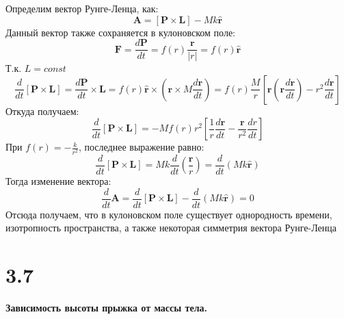 \documentclass[a4paper,14pt]{article}
\begin{document}
Определим вектор Рунге-Ленца, как:
\begin{equation*}
\mathbf A = [\mathbf P \times \mathbf L] - Mk\widehat{\mathbf r}
\end{equation*}
Данный вектор также сохраняется в кулоновском поле:
\begin{equation*}
\mathbf F =\frac{d \mathbf P}{dt} = f(r)\frac{\mathbf r}{|r|} = f(r)\widehat{\mathbf r}
\end{equation*}
Т.к. $L = const$
\begin{equation*}
\frac{d}{dt} [\mathbf P \times \mathbf L ] = \frac{d \mathbf P}{dt} \times \mathbf L =  f(r)\widehat{\mathbf r} \times \left(\mathbf r \times M \frac{d\mathbf r}{dt} \right) =  f(r)\frac{M}{r}\left[ \mathbf r\left(\mathbf r \frac{d\mathbf r}{dt}\right) - r^2\frac{d\mathbf r}{dt} \right]
\end{equation*}
Откуда получаем:
\begin{equation*}
\frac{d}{dt} [\mathbf P \times \mathbf L ] = -M f(r) r^2 \left[\frac{1}{r}\frac{d\mathbf r}{dt} - \frac{\mathbf r}{r^2}\frac{dr}{dt}  \right]
\end{equation*}
При $f(r) = -\frac{k}{r^2}$, последнее выражение равно:
\begin{equation*}
\frac{d}{dt} [\mathbf P \times \mathbf L ] = Mk\frac{d}{dt}\left( \frac{\mathbf r}{r}\right) = \frac{d}{dt}(Mk\widehat{\mathbf r})
\end{equation*}
Тогда изменение вектора:
\begin{equation*}
\frac{d}{dt}\mathbf A = \frac{d}{dt} [\mathbf P \times \mathbf L ] - \frac{d}{dt}(Mk\widehat{\mathbf r}) = 0
\end{equation*}
Отсюда получаем, что в кулоновском поле существует однородность времени, изотропность пространства, а также некоторая симметрия вектора Рунге-Ленца

\section*{3.7}

\begin{center}
	\LARGE{\textbf{Зависимость высоты прыжка от массы тела.}}\\
\end{center}
\end{document}
